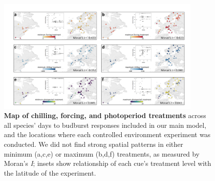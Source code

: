 \documentclass{article}
\begin{document}
\begin{figure}[h!]
\centering
\noindent \includegraphics[width=0.9\textwidth]{..//..//analyses/bb_analysis/figures/minmaxtreatmentsmap.png}
\caption{\textbf{Map of chilling, forcing, and photoperiod treatments} across all species' days to budburst responses included in our main model, and the locations where each controlled environment experiment was conducted. We did not find strong spatial patterns in either minimum (a,c,e) or maximum (b,d,f) treatments, as measured by Moran's \emph{I}; insets show relationship of each cue's treatment level with the latitude of the experiment.}
\label{fig:trtmap}
\end{figure}
\end{document}
